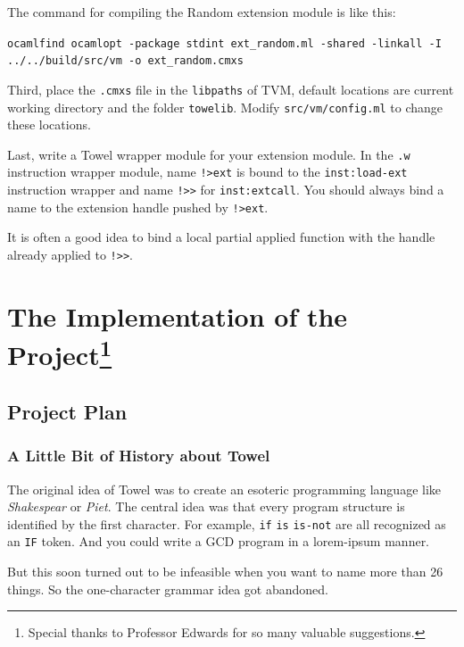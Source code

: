 \documentclass{report}
\newcommand{\inst}[1] {\texttt{inst:#1}}
\begin{document}
The command for compiling the Random extension module is like this:

\begin{mdframed}[style=example]
  \texttt{ocamlfind ocamlopt -package stdint ext\_random.ml -shared
    -linkall -I ../../build/src/vm -o ext\_random.cmxs}
\end{mdframed}

Third, place the \texttt{.cmxs} file in the \texttt{libpaths} of TVM, default locations are current working directory and the folder \texttt{towelib}. Modify \texttt{src/vm/config.ml} to change these locations.

Last, write a Towel wrapper module for your extension module. In the \texttt{.w} instruction wrapper module, name \texttt{!>ext} is bound to the \inst{load-ext} instruction wrapper and name \texttt{!>>} for \inst{extcall}. You should always bind a name to the extension handle pushed by \texttt{!>ext}.

\begin{mdframed}[style=hint]
  It is often a good idea to bind a local partial applied function with the handle already applied to \texttt{!>>}.
\end{mdframed}

\part[The Implementation of the Project]{The Implementation of the Project\footnote{Special thanks to Professor Edwards for so many valuable suggestions.}}

\chapter{Project Plan}

\section{A Little Bit of History about Towel}
The original idea of Towel was to create an esoteric programming language like \textit{Shakespear} or \textit{Piet}. The central idea was that every program structure is identified by the first character. For example, \texttt{if} \texttt{is} \texttt{is-not} are all recognized as an \texttt{IF} token. And you could write a GCD program in a lorem-ipsum manner.

But this soon turned out to be infeasible when you want to name more than 26 things. So the one-character grammar idea got abandoned.
\end{document}
